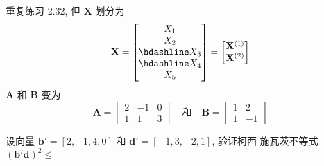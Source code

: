\medskip
{}\quad 重复练习 2.32, 但 $\mathbf{X}$ 划分为
\[
\mathbf{X}=\begin{bmatrix}X_{1}\\X_{2}\\\hdashline X_{3}\\\hdashline X_{4}\\X_{5}\end{bmatrix}
=\begin{bmatrix}\mathbf{X}^{(1)}\\\mathbf{X}^{(2)}\end{bmatrix}
\]
$\mathbf{A}$ 和 $\mathbf{B}$ 变为
\[
\mathbf{A}=\begin{bmatrix}2&-1&0\\1&1&3\end{bmatrix}\quad\text{和}\quad
\mathbf{B}=\begin{bmatrix}1&2\\1&-1\end{bmatrix}
\]

\medskip
{}\quad 设向量 $\mathbf{b}'=[2,-1,4,0]$ 和 $\mathbf{d}'=[-1,3,-2,1]$, 验证柯西-施瓦茨不等式 $(\mathbf{b}'\mathbf{d})^{2}\le$
